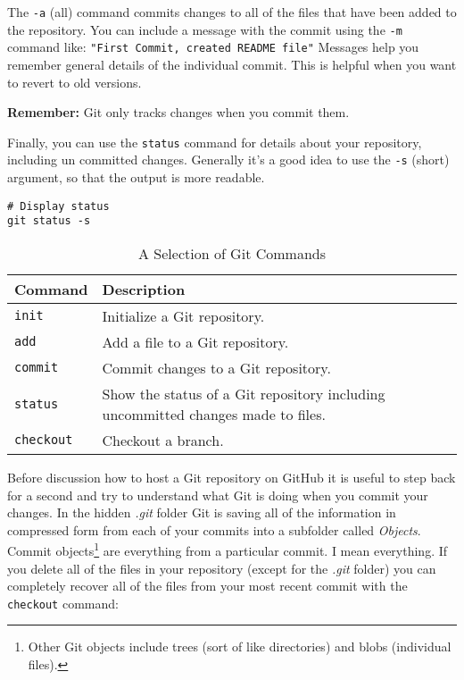 \nodindent The \texttt{-a} (all) command commits changes to all of the files that have been added to the repository. You can include a message with the commit using the \texttt{-m} command like: \texttt{"First Commit, created README file"} Messages help you remember general details of the individual commit. This is helpful when you want to revert to old versions.

\noindent \textbf{Remember:} Git only tracks changes when you commit them. 

Finally, you can use the \texttt{status} command for details about your repository, including un committed changes. Generally it's a good idea to use the \texttt{-s} (short) argument, so that the output is more readable.

\begin{knitrout}
\color{fgcolor}\begin{kframe}
\begin{verbatim}
# Display status
git status -s
\end{verbatim}
\end{kframe}
\end{knitrout}


\begin{table}
  \caption{A Selection of Git Commands}
  \begin{center}
  \label{GitCommandsTable}
  \begin{tabular}{l p{5cm}}
    \hline  
    Command & Description \\[0.25cm] \hline\hline
    \texttt{init} & Initialize a Git repository. \\[0.25cm]
    \texttt{add} & Add a file to a Git repository. \\[0.25cm]
    \texttt{commit} & Commit changes to a Git repository. \\[0.25cm]
    \texttt{status} & Show the status of a Git repository including uncommitted changes made to files. \\[0.25cm]
    \texttt{checkout} & Checkout a branch. \\[0.25cm]
    \hline
  \end{tabular}
  \end{center}
\end{table}

Before discussion how to host a Git repository on GitHub it is useful to step back for a second and try to understand what Git is doing when you commit your changes. In the hidden {\emph{.git}} folder Git is saving all of the information in compressed form from each of your commits into a subfolder called {\emph{Objects}}. Commit objects\footnote{Other Git objects include trees (sort of like directories) and blobs (individual files).} are everything from a particular commit. I mean everything. If you delete all of the files in your repository (except for the {\emph{.git}} folder) you can completely recover all of the files from your most recent commit with the \texttt{checkout} command:

